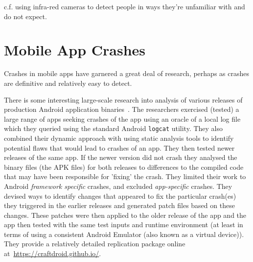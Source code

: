 c.f. using infra-red cameras to detect people in ways they're unfamiliar with and do not expect. 

\section{Mobile App Crashes}
Crashes in mobile apps have garnered a great deal of research, perhaps as crashes are definitive and relatively easy to detect.

There is some interesting large-scale research into analysis of various releases of production Android application binaries~\citep{kong2019_mining_android_crash_fixes}. The researchers exercised (tested) a large range of apps seeking crashes of the app using an oracle of a local log file which they queried using the standard Android \texttt{logcat} utility. They also combined their dynamic approach with using static analysis tools to identify potential flaws that would lead to crashes of an app. They then tested newer releases of the same app. If the newer version did not crash they analysed the binary files (the APK files) for both releases to differences to the compiled code that may have been responsible for 'fixing' the crash. They limited their work to Android \emph{framework specific} crashes, and excluded \emph{app-specific} crashes. They devised ways to identify changes that appeared to fix the particular crash(es) they triggered in the earlier releases and generated patch files based on these changes. These patches were then applied to the older release of the app and the app then tested with the same test inputs and runtime environment (at least in terms of using a consistent Android Emulator (also known as a virtual device)). They provide a relatively detailed replication package online at~\url{https://craftdroid.github.io/}.

